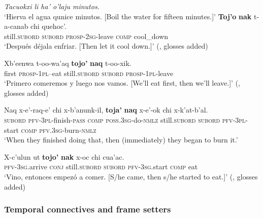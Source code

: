 \begin{exe}
	\ex\label{exAppendixKekchiSequencing1}
	\textit{Tacuokxi li ha' o'laju minutos.}\\
	\lq Hierva el agua qunice minutos. [Boil the water for fifteen minutes.]\rq
	\sn\gll \textbf{Toj’o} \textbf{nak} t-a-canab chi quehoc’.\\
	still.\textsc{subord} \textsc{subord} \textsc{prosp}-2\textsc{sg}-leave \textsc{comp} cool\_down\\
	\glt \lq Después déjala enfriar. [Then let it cool down.]\rq{ }(\cite[122]{EachusCarlson1980}, glosses added)
	
	\ex\label{exAppendixKekchiSequencing2}
	\gll Xb’eenwa t-oo-wa’aq \textbf{tojo’} \textbf{naq} t-oo-xik.\\
	first  \textsc{prosp}-1\textsc{pl}--eat still.\textsc{subord} \textsc{subord} \textsc{prosp}-1\textsc{pl-}leave\\
	\glt \lq Primero comeremos y luego nos vamos. [We'll eat first, then we'll leave.]\rq{ } (\cite[193]{VocabularioKechi2004}, glosses added)
	
	\ex\label{exAppendixKekchiSequencing3}
	\gll Naq x-e'-raq-e' chi x-b'anunk-il, \textbf{toja'} \textbf{naq} x-e'-ok chi x-k'at-b'al.\\
	\textsc{subord} \textsc{pfv}-3\textsc{pl}-finish-\textsc{pass} \textsc{comp} \textsc{poss}.3\textsc{sg}-do-\textsc{nmlz} still.\textsc{subord} \textsc{subord} \textsc{pfv}-3\textsc{pl}-start \textsc{comp} \textsc{pfv}.3\textsc{sg}-burn-\textsc{nmlz}\\
	\glt \lq When they finished doing that, then (immediately) they began to burn it.' \parencite[468]{Kockelman2020}
	
	\ex\label{exAppendixKekchiSequencing4}
	\gll X-c'ulun ut \textbf{tojo'} \textbf{nak} x-oc chi cua'ac.\\
	\textsc{pfv}-3\textsc{sg}.arrive \textsc{conj} still.\textsc{subord} \textsc{subord} \textsc{pfv}-3\textsc{sg}.start \textsc{comp} eat\\
	\glt \lq Vino, entonces empezó a comer. [S/he came, then s/he started to eat.]' (\cite[202]{EachusCarlson1980}, glosses added)
\end{exe}

\subsubsection{Temporal connectives and frame setters}
